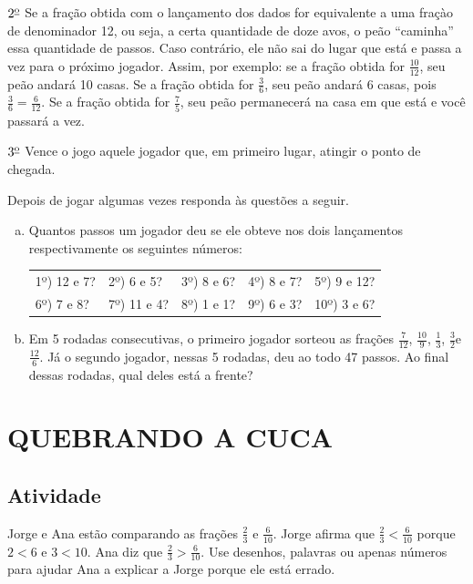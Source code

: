 $2^{\textrm{\underline{o}}}$ Se a fração obtida com o lançamento dos dados for equivalente a uma fraçào de denominador 12, ou seja, a certa quantidade de doze avos, o peão ``caminha'' essa quantidade de passos. Caso contrário, ele não sai do lugar que está e passa a vez para o próximo jogador. Assim, por exemplo: se a fração obtida for $\frac{10}{12}$, seu peão andará 10 casas. Se a fração obtida for $\frac{3}{6}$, seu peão andará $6$ casas, pois $\frac{3}{6} = \frac{6}{12}$. Se a fração obtida for $\frac{7}{5}$, seu peão permanecerá na casa em que está e você passará a vez.

$3^{\textrm{\underline{o}}}$ Vence o jogo aquele jogador que, em primeiro lugar, atingir o ponto de chegada.

Depois de jogar algumas vezes responda às questões a seguir.


\begin{enumerate}[a)]
 \item Quantos passos um jogador deu se ele obteve nos dois lançamentos respectivamente os seguintes números:

 \noindent \begin{tabular}{m{}m{}m{}m{}m{}}
1º) 12 e 7?  & 2º) 6 e 5? & 3º) 8 e 6? & 4º) 8 e 7? & 5º) 9 e 12? \\
6º) 7 e 8? & 7º) 11 e 4? & 8º) 1 e 1? & 9º) 6 e 3? & 10º) 3 e 6?
\end{tabular}

\item   Em 5 rodadas consecutivas, o primeiro jogador sorteou as frações  $\frac{7}{12}$, $\frac{10}{9}$, $\frac{1}{3}$, $\frac{3}{2}$e  $\frac{12}{6}$. Já o segundo jogador, nessas 5 rodadas, deu ao todo 47 passos. Ao final dessas rodadas, qual deles está a frente?
\end{enumerate}


\section{QUEBRANDO A CUCA }


\subsection{Atividade}

Jorge e Ana estão comparando as frações $\frac{2}{3}$ e $\frac{6}{10}$. Jorge afirma que
$\frac{2}{3} < \frac{6}{10}$ porque $2 < 6$ e $3 < 10$. Ana diz que $\frac{2}{3} > \frac{6}{10}$. Use desenhos, palavras ou apenas números para ajudar Ana a explicar a Jorge porque ele está errado.

